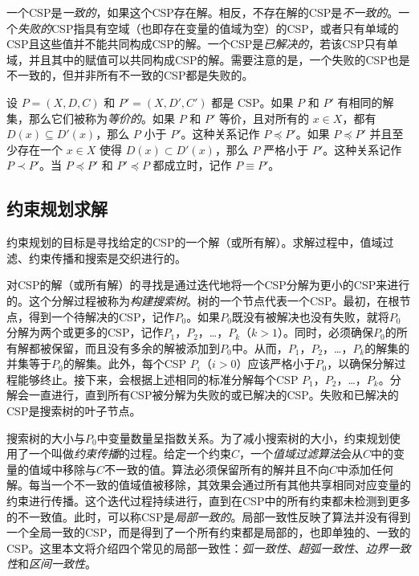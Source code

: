 一个CSP是\textit{一致的}，如果这个CSP存在解。相反，不存在解的CSP是\textit{不一致的}。一个\textit{失败的}CSP指具有空域（也即存在变量的值域为空）的CSP，或者只有单域的CSP且这些值并不能共同构成CSP的解。一个CSP是\textit{已解决的}，若该CSP只有单域，并且其中的赋值可以共同构成CSP的解。需要注意的是，一个失败的CSP也是不一致的，但并非所有不一致的CSP都是失败的。

设 $P = (X, D, C)$ 和 $P' = (X , D', C')$ 都是 CSP。如果 $P$ 和 $P'$ 有相同的解集，那么它们被称为\textit{等价的}。如果 $P$ 和 $P'$ 等价，且对所有的 $x \in X$，都有 $D(x) \subseteq D'(x)$，那么 $P$ 小于 $P'$。这种关系记作 $P \preceq P'$。如果 $P \preceq P'$ 并且至少存在一个 $x \in X$ 使得 $D(x) \subset D'(x)$，那么 $P$ 严格小于 $P'$。这种关系记作 $P \prec P'$。当 $P \preceq P'$ 和 $P' \preceq P$ 都成立时，记作 $P \equiv P'$。

\subsection{约束规划求解}

约束规划的目标是寻找给定的CSP的一个解（或所有解）。求解过程中，值域过滤、约束传播和搜索是交织进行的。

对CSP的解（或所有解）的寻找是通过迭代地将一个CSP分解为更小的CSP来进行的。这个分解过程被称为\textit{构建搜索树}。树的一个节点代表一个CSP。最初，在根节点，得到一个待解决的CSP，记作$P_0$。如果$P_0$既没有被解决也没有失败，就将$P_0$分解为两个或更多的CSP，记作$P_1$，$P_2$，…，$P_k$（$k>1$）。同时，必须确保$P_0$的所有解都被保留，而且没有多余的解被添加到$P_0$中。从而，$P_1$，$P_2$，…，$P_k$的解集的并集等于$P_0$的解集。此外，每个CSP $P_i$（$i>0$）应该严格小于$P_0$，以确保分解过程能够终止。接下来，会根据上述相同的标准分解每个CSP $P_1$，$P_2$，…，$P_k$。分解会一直进行，直到所有CSP被分解为失败的或已解决的CSP。失败和已解决的CSP是搜索树的叶子节点。

搜索树的大小与$P_0$中变量数量呈指数关系。为了减小搜索树的大小，约束规划使用了一个叫做\textit{约束传播}的过程。给定一个约束$C$，一个\textit{值域过滤算法}会从$C$中的变量的值域中移除与$C$不一致的值。算法必须保留所有的解并且不向$C$中添加任何解。每当一个不一致的值域值被移除，其效果会通过所有其他共享相同对应变量的约束进行传播。这个迭代过程持续进行，直到在CSP中的所有约束都未检测到更多的不一致值。此时，可以称CSP是\textit{局部一致的}。局部一致性反映了算法并没有得到一个全局一致的CSP，而是得到了一个所有约束都是局部的，也即单独的、一致的CSP。这里本文将介绍四个常见的局部一致性：\textit{弧一致性}、\textit{超弧一致性}、\textit{边界一致性}和\textit{区间一致性}。

